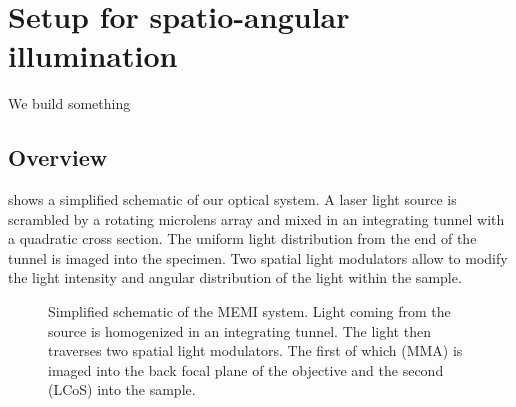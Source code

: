 
\newcommand{\imagw}[3]{
  \begin{figure}[!hbt]
    \centering
    \texttt{[image: \#2]}
    \caption{#3}
    \label{fig:#2}
  \end{figure}
}

\newcommand{\imag}[2]{\imagw{16cm}{#1}{#2}}

\chapter{Setup for spatio-angular illumination}
\begin{summary}
  We build something
\end{summary}

\section{Overview}
 shows a simplified schematic of our optical
system. A laser light source is scrambled by a rotating microlens
array and mixed in an integrating tunnel with a quadratic cross
section. The uniform light distribution from the end of the tunnel is
imaged into the specimen. Two spatial light modulators allow to modify
the light intensity and angular distribution of the light within the
sample.

\begin{figure}[!hbt]
  \centering
  \def\svgscale{1.5}
  
  \caption{Simplified schematic of the MEMI system. Light coming from
    the source is homogenized in an integrating tunnel. The light then
    traverses two spatial light modulators. The first of which (MMA)
    is imaged into the back focal plane of the objective and the
    second (LCoS) into the sample.}
  \label{fig:memi-simple}
\end{figure}

